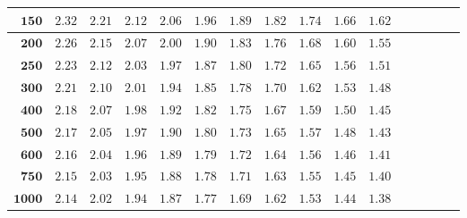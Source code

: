 \begin{longtable}{|r|r|r|r|r|r|r|r|r|r|r|r|r|r|r|r|}
    \(\mathbf{150}\) & \(2.32\)  & \(2.21\)  & \(2.12\)  & \(2.06\)  & \(1.96\)  & \(1.89\)  & \(1.82\)  & \(1.74\)  & \(1.66\)  & \(1.62\) \\ \hline 
    \(\mathbf{200}\) & \(2.26\)  & \(2.15\)  & \(2.07\)  & \(2.00\)  & \(1.90\)  & \(1.83\)  & \(1.76\)  & \(1.68\)  & \(1.60\)  & \(1.55\) \\ \hline 
    \(\mathbf{250}\) & \(2.23\)  & \(2.12\)  & \(2.03\)  & \(1.97\)  & \(1.87\)  & \(1.80\)  & \(1.72\)  & \(1.65\)  & \(1.56\)  & \(1.51\) \\ \hline 
    \(\mathbf{300}\) & \(2.21\)  & \(2.10\)  & \(2.01\)  & \(1.94\)  & \(1.85\)  & \(1.78\)  & \(1.70\)  & \(1.62\)  & \(1.53\)  & \(1.48\) \\ \hline 
    \(\mathbf{400}\) & \(2.18\)  & \(2.07\)  & \(1.98\)  & \(1.92\)  & \(1.82\)  & \(1.75\)  & \(1.67\)  & \(1.59\)  & \(1.50\)  & \(1.45\) \\ \hline 
    \(\mathbf{500}\) & \(2.17\)  & \(2.05\)  & \(1.97\)  & \(1.90\)  & \(1.80\)  & \(1.73\)  & \(1.65\)  & \(1.57\)  & \(1.48\)  & \(1.43\) \\ \hline 
    \(\mathbf{600}\) & \(2.16\)  & \(2.04\)  & \(1.96\)  & \(1.89\)  & \(1.79\)  & \(1.72\)  & \(1.64\)  & \(1.56\)  & \(1.46\)  & \(1.41\) \\ \hline 
    \(\mathbf{750}\) & \(2.15\)  & \(2.03\)  & \(1.95\)  & \(1.88\)  & \(1.78\)  & \(1.71\)  & \(1.63\)  & \(1.55\)  & \(1.45\)  & \(1.40\) \\ \hline 
    \(\mathbf{1000}\) & \(2.14\)  & \(2.02\)  & \(1.94\)  & \(1.87\)  & \(1.77\)  & \(1.69\)  & \(1.62\)  & \(1.53\)  & \(1.44\)  & \(1.38\) \\ \hline 
\end{longtable}
\changefontsizes{11pt}

\renewcommand{\arraystretch}{1}










